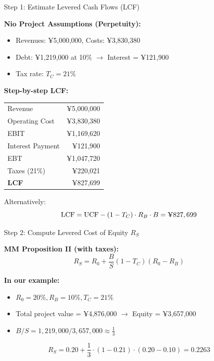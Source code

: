 \begin{frame}{Step 1: Estimate Levered Cash Flows (LCF)}
	
	\textbf{Nio Project Assumptions (Perpetuity):}
	\begin{itemize}
		\item Revenues: ¥5,000,000, Costs: ¥3,830,380
		\item Debt: ¥1,219,000 at 10\% $\rightarrow$ Interest = ¥121,900
		\item Tax rate: \( T_C = 21\% \)
	\end{itemize}
	
	\textbf{Step-by-step LCF:}
	\begin{table}[]
		\centering
		\begin{tabular}{lr}
			\toprule
			Revenue             & ¥5,000,000 \\
			Operating Cost      & ¥3,830,380 \\
			EBIT                & ¥1,169,620 \\
			Interest Payment    & ¥121,900 \\
			\midrule
			EBT                 & ¥1,047,720 \\
			Taxes (21\%)        & ¥220,021 \\
			\midrule
			\textbf{LCF}        & ¥827,699 \\
			\bottomrule
		\end{tabular}
	\end{table}
	
\small
	Alternatively:  
	\[
	\text{LCF} = \text{UCF} - (1 - T_C) \cdot R_B \cdot B = \text{\textyen}827,699
	\]
	
\end{frame}

\begin{frame}{Step 2: Compute Levered Cost of Equity \( R_S \)}
	
	\textbf{MM Proposition II (with taxes):}
	\[
	R_S = R_0 + \frac{B}{S}(1 - T_C)(R_0 - R_B)
	\]
	
	\vspace{0.2cm}
	\textbf{In our example:}
	\begin{itemize}
		\item \( R_0 = 20\%, R_B = 10\%, T_C = 21\% \)
		\item Total project value = ¥4,876,000 $\rightarrow$ Equity = ¥3,657,000
		\item \( B/S = 1,219,000 / 3,657,000 \approx \frac{1}{3} \)
	\end{itemize}
	
	\vspace{0.2cm}
	\[
	R_S = 0.20 + \frac{1}{3} \cdot (1 - 0.21) \cdot (0.20 - 0.10) = 0.2263
	\]
	
\end{frame}

